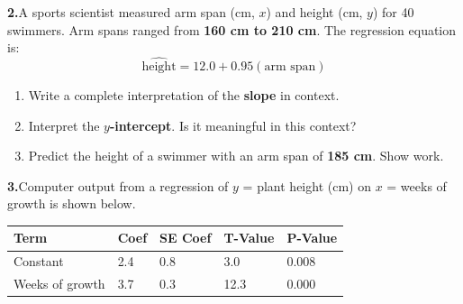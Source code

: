 \documentclass[10pt]{article}
\begin{document}
\vspace{0.18in}

\noindent\textbf{2.}\enspace A sports scientist measured arm span (cm, $x$) and height (cm,
$y$) for 40 swimmers. Arm spans ranged from \textbf{160 cm to 210 cm}. The regression
equation is:
\[
  \widehat{\text{height}} = 12.0 + 0.95(\text{arm span})
\]

\begin{enumerate}[label=\textbf{(\alph*)}, leftmargin=2em, itemsep=0.18in]

  \item Write a complete interpretation of the \textbf{slope} in context.\\[8pt]

  \item Interpret the \textbf{$y$-intercept}. Is it meaningful in this context?\\[8pt]

  \item Predict the height of a swimmer with an arm span of \textbf{185 cm}. Show work.\\[8pt]

\end{enumerate}

\vspace{0.18in}

\noindent\textbf{3.}\enspace Computer output from a regression of $y$ = plant height (cm) on
$x$ = weeks of growth is shown below.

\vspace{8pt}
\renewcommand{\arraystretch}{1.4}
\begin{tabularx}{\linewidth}{@{} l X X X X @{}}
\rowcolor{sky}
\textbf{Term} & \textbf{Coef} & \textbf{SE Coef} & \textbf{T-Value} & \textbf{P-Value} \\
\midrule
Constant       & 2.4  & 0.8  & 3.0  & 0.008 \\
Weeks of growth & 3.7  & 0.3  & 12.3 & 0.000 \\
\end{tabularx}
\end{document}
